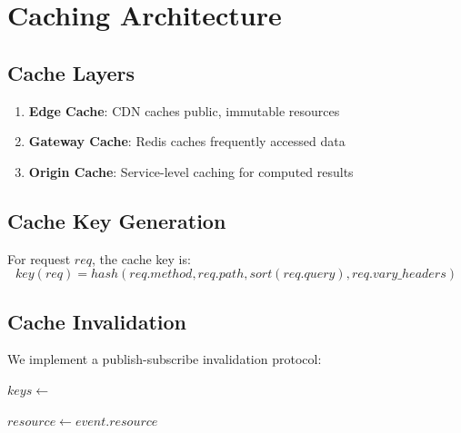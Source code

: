 \section{Caching Architecture}


\subsection{Cache Layers}

\begin{enumerate}
    \item \textbf{Edge Cache}: CDN caches public, immutable resources
    \item \textbf{Gateway Cache}: Redis caches frequently accessed data
    \item \textbf{Origin Cache}: Service-level caching for computed results
\end{enumerate}

\subsection{Cache Key Generation}

\begin{definition}
For request $req$, the cache key is:
\begin{equation}
key(req) = hash(req.method, req.path, sort(req.query), req.vary\_headers)
\end{equation}
\end{definition}

\subsection{Cache Invalidation}

We implement a publish-subscribe invalidation protocol:

\begin{algorithm}
\caption{Cache Invalidation}
\begin{algorithmic}[1]
    \State $keys \gets$ 
        \State {}
    \EndFor
    \State {}
\EndFunction

    \State $resource \gets event.resource$
    \State {}
        \State {}
    \EndFor
\EndFunction
\end{algorithmic}
\end{algorithm}

